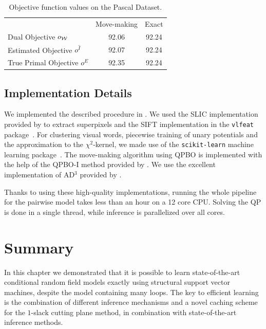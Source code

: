 \begin{table}
    \begin{center}
    \begin{tabularx}{\linewidth}{@{\extracolsep{\fill}}lcc}
    \toprule
                    & Move-making & Exact \\
    \cmidrule{1-3}
    Dual Objective $o_{\mathcal{W}}$ &92.06& 92.24\\
    Estimated Objective $o^{\hat{I}}$ & 92.07 &92.24\\
    True Primal Objective $o^E$&92.35& 92.24  \\
    \bottomrule
    \end{tabularx}
    \end{center}
    \caption{Objective function values on the Pascal Dataset.}
\end{table}


\subsection{Implementation Details}
We implemented the described procedure in \pystruct.
We used the SLIC implementation provided by \citet{achanta2012slic} to extract superpixels and
the SIFT implementation in the \texttt{vlfeat} package~\citep{vedaldi08vlfeat}.
For clustering visual words, piecewise training of unary potentials and the
approximation to the $\chi^2$-kernel, we made use of the \texttt{scikit-learn}
machine learning package~\citep{pedregosa2011scikit}.
The move-making algorithm using QPBO is implemented with the help of the QPBO-I
method provided by \citet{rother2007optimizing}.
We use the excellent implementation of AD$^3$ provided by
\citet{martins2011augmented}. 

Thanks to using these high-quality implementations, running the whole pipeline
for the pairwise model takes less than an hour on a 12 core CPU\@. Solving the
QP is done in a single thread, while inference is parallelized over all cores.
 
\section{Summary}
In this chapter we demonstrated that it is possible to learn state-of-the-art
conditional random field models exactly using structural support vector
machines, despite the model containing many loops.  The key to efficient
learning is the combination of different inference mechanisms and a novel
caching scheme for the $1$-slack cutting plane method, in combination with
state-of-the-art inference methods.

